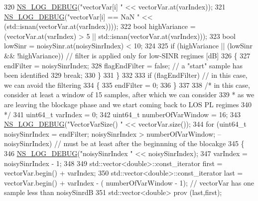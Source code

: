 \begin{DoxyCode}
320                 \hyperlink{group__logging_ga413f1886406d49f59a6a0a89b77b4d0a}{NS\_LOG\_DEBUG}(\textcolor{stringliteral}{"vectorVar[i] "} << vectorVar.at(varIndex));
321                 \hyperlink{group__logging_ga413f1886406d49f59a6a0a89b77b4d0a}{NS\_LOG\_DEBUG}(\textcolor{stringliteral}{"vectorVar[i] == NaN "} << (std::isnan(vectorVar.at(varIndex))));
322                 \textcolor{keywordtype}{bool} highVariance = (vectorVar.at(varIndex) > 5 || std::isnan(vectorVar.at(varIndex)));
323                 \textcolor{keywordtype}{bool} lowSinr = noisySinr.at(noisySinrIndex) < 10;
324 
325                 \textcolor{keywordflow}{if} (highVariance || (lowSinr && !highVariance))  \textcolor{comment}{// filter is applied only for low-SINR
       regimes [dB]}
326                 \{
327                         endFilter = noisySinrIndex;
328                         flagEndFilter = \textcolor{keyword}{false}; \textcolor{comment}{// a "start" sample has been identified}
329                         \textcolor{keywordflow}{break};
330                 \}
331         \}
332 
333         \textcolor{keywordflow}{if} (flagEndFilter) \textcolor{comment}{// in this case, we can avoid the filtering}
334         \{
335                 endFilter = 0; 
336         \}
337 
338         \textcolor{comment}{/* in this case, consider at least a window of 15 samples, after which we can consider}
339 \textcolor{comment}{        * as we are leaving the blockage phase and we start coming back to LOS PL regimes}
340 \textcolor{comment}{        */}
341         uint64\_t varIndex = 0;
342         uint64\_t numberOfVarWindow = 16;
343         \hyperlink{group__logging_ga413f1886406d49f59a6a0a89b77b4d0a}{NS\_LOG\_DEBUG}(\textcolor{stringliteral}{"VectorVarSize() "} << vectorVar.size());
344         \textcolor{keywordflow}{for} (uint64\_t noisySinrIndex = endFilter; noisySinrIndex > numberOfVarWindow; --noisySinrIndex) \textcolor{comment}{//
       must be at least after the beginnning of the blocakge}
345         \{
346                 \hyperlink{group__logging_ga413f1886406d49f59a6a0a89b77b4d0a}{NS\_LOG\_DEBUG}(\textcolor{stringliteral}{"noisySinrIndex "} << noisySinrIndex);
347                 varIndex = noisySinrIndex - 1;
348                 
349                 std::vector<double>::const\_iterator first = vectorVar.begin() + varIndex; 
350                 std::vector<double>::const\_iterator last = vectorVar.begin() + varIndex - (
      numberOfVarWindow - 1); \textcolor{comment}{// vectorVar has one sample less than noisySinrdB}
351                 std::vector<double> prov (last,first); 

\end{DoxyCode}
